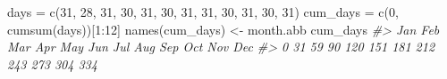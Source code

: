 \documentclass[
]{article}
\newenvironment{Shaded}{\begin{snugshade}}{\end{snugshade}}
\newcommand{\CommentTok}[1]{\textcolor[rgb]{0.56,0.35,0.01}{\textit{#1}}}
\newcommand{\DecValTok}[1]{\textcolor[rgb]{0.00,0.00,0.81}{#1}}
\newcommand{\FunctionTok}[1]{\textcolor[rgb]{0.00,0.00,0.00}{#1}}
\newcommand{\NormalTok}[1]{#1}
\newcommand{\OtherTok}[1]{\textcolor[rgb]{0.56,0.35,0.01}{#1}}
\newcommand{\SpecialCharTok}[1]{\textcolor[rgb]{0.00,0.00,0.00}{#1}}
\begin{document}
\begin{Shaded}
\begin{Highlighting}[]
\NormalTok{days }\OtherTok{=} \FunctionTok{c}\NormalTok{(}\DecValTok{31}\NormalTok{, }\DecValTok{28}\NormalTok{, }\DecValTok{31}\NormalTok{, }\DecValTok{30}\NormalTok{, }\DecValTok{31}\NormalTok{, }\DecValTok{30}\NormalTok{, }\DecValTok{31}\NormalTok{, }\DecValTok{31}\NormalTok{, }\DecValTok{30}\NormalTok{, }\DecValTok{31}\NormalTok{, }\DecValTok{30}\NormalTok{, }\DecValTok{31}\NormalTok{)}
\NormalTok{cum\_days }\OtherTok{=} \FunctionTok{c}\NormalTok{(}\DecValTok{0}\NormalTok{, }\FunctionTok{cumsum}\NormalTok{(days))[}\DecValTok{1}\SpecialCharTok{:}\DecValTok{12}\NormalTok{]}
\FunctionTok{names}\NormalTok{(cum\_days) }\OtherTok{\textless{}{-}}\NormalTok{ month.abb}
\NormalTok{cum\_days}
\CommentTok{\#\textgreater{} Jan Feb Mar Apr May Jun Jul Aug Sep Oct Nov Dec }
\CommentTok{\#\textgreater{}   0  31  59  90 120 151 181 212 243 273 304 334}
\end{Highlighting}
\end{Shaded}
\end{document}
